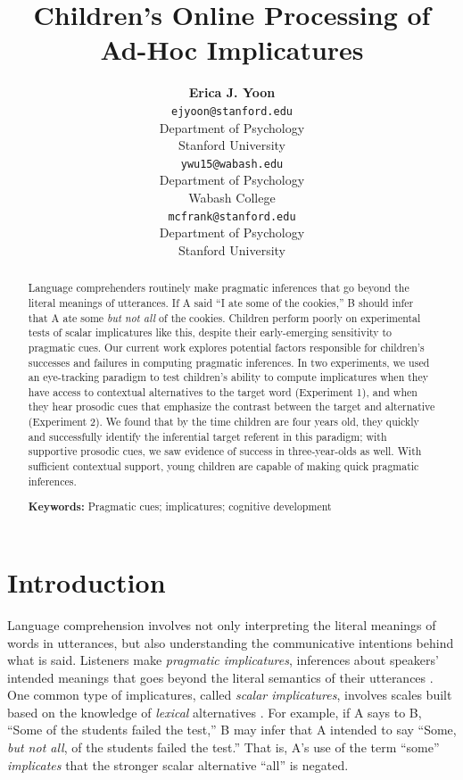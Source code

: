 \documentclass[10pt,letterpaper]{article}
\title{Children's Online Processing of Ad-Hoc Implicatures}
\author{{\large \bf Erica J. Yoon} \\ \texttt{ejyoon@stanford.edu} \\
  Department of Psychology \\
  Stanford University
  \And {\large \bf Yunan Charles Wu} \\ \texttt{ywu15@wabash.edu} \\
  Department of Psychology \\
  Wabash College
  \And {\large \bf Michael C. Frank} \\ \texttt{mcfrank@stanford.edu} \\
  Department of Psychology \\
  Stanford University}
\begin{document}
\maketitle

\begin{abstract}
Language comprehenders routinely make pragmatic inferences that go beyond the literal meanings of utterances. If A said ``I ate some of the cookies,'' B should infer that A ate some \emph{but not all} of the cookies. Children perform poorly on experimental tests of scalar implicatures like this, despite their early-emerging sensitivity to pragmatic cues. Our current work explores potential factors responsible for children's successes and failures in computing pragmatic inferences. In two experiments, we used an eye-tracking paradigm to test children's ability to compute implicatures when they have access to contextual alternatives to the target word (Experiment 1), and when they hear prosodic cues that emphasize the contrast between the target and alternative (Experiment 2). We found that by the time children are four years old, they quickly and successfully identify the inferential target referent in this paradigm; with supportive prosodic cues, we saw evidence of success in three-year-olds as well. With sufficient contextual support, young children are capable of making quick pragmatic inferences.

\textbf{Keywords:} 
Pragmatic cues; implicatures; cognitive development

\end{abstract}


\section{Introduction}

Language comprehension involves not only interpreting the literal meanings of words in utterances, but also understanding the communicative intentions behind what is said. Listeners make \emph{pragmatic implicatures}, inferences about speakers' intended meanings that goes beyond the literal semantics of their utterances \cite{grice1975logic}. One common type of implicatures, called  \emph{scalar implicatures}, involves scales built based on the knowledge of \emph{lexical} alternatives \cite{horn1972}. For example, if A says to B, ``Some of the students failed the test,'' B may infer that A intended to say ``Some, \emph{but not all}, of the students failed the test.'' That is, A's use of the term ``some'' \emph{implicates} that the stronger scalar alternative ``all'' is negated. 
\end{document}
